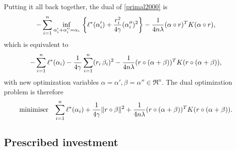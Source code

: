 Putting it all back together, the dual of \eqref{primal2000} is
\begin{equation}
  -\sum_{i=1}^n \inf_{\alpha_i'+\alpha_i''=\alpha_i}\,\left\{\ell^*(\alpha_i') + \frac{r_i^2}{4\gamma}(\alpha_i'')^2\right\}  - \frac{1}{4n\lambda} (\alpha \circ r)^TK(\alpha \circ r),
\end{equation}
which is equivalent to
\begin{equation}
  -\sum_{i=1}^n \ell^*(\alpha_i) - \frac{1}{4\gamma}\sum_{i=1}^n (r_i\,\beta_i)^2 - \frac{1}{4n\lambda}(r \circ (\alpha+\beta))^TK(r \circ (\alpha+\beta)),
\end{equation}
with new optimization variables $\alpha=\alpha',\beta=\alpha'' \in \Re^n$. The dual optimization problem is
therefore
\begin{equation}
  \begin{array}{ll}\operatorname*{minimiser} & \displaystyle{\sum_{i=1}^n\ell^*(\alpha_i) + \frac{1}{4\gamma}\|r\circ\beta\|^2 + \frac{1}{4n\lambda}(r \circ (\alpha+\beta))^TK(r \circ (\alpha+\beta)).}\end{array}
\end{equation}


\subsection{Prescribed investment}
\todo{}











